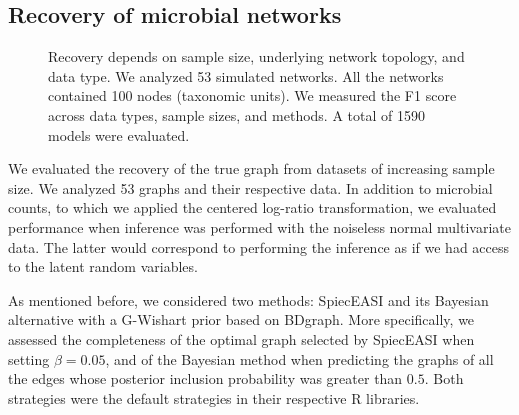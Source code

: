 \documentclass[
  a4paper,
]{article}
\begin{document}
\hypertarget{recovery-of-microbial-networks}{%
\subsection{Recovery of microbial
networks}\label{recovery-of-microbial-networks}}

\begin{figure}

\begin{minipage}[t]{\linewidth}

{\centering 


}

\end{minipage}%
\newline
\begin{minipage}[t]{\linewidth}

{\centering 


}

\end{minipage}%

\caption{\label{fig-prec_recall}Recovery depends on sample size,
underlying network topology, and data type. We analyzed 53 simulated
networks. All the networks contained 100 nodes (taxonomic units). We
measured the F1 score across data types, sample sizes, and methods. A
total of 1590 models were evaluated.}

\end{figure}

We evaluated the recovery of the true graph from datasets of increasing
sample size. We analyzed 53 graphs and their respective data. In
addition to microbial counts, to which we applied the centered log-ratio
transformation, we evaluated performance when inference was performed
with the noiseless normal multivariate data. The latter would correspond
to performing the inference as if we had access to the latent random
variables.

As mentioned before, we considered two methods: SpiecEASI and its
Bayesian alternative with a G-Wishart prior based on BDgraph. More
specifically, we assessed the completeness of the optimal graph selected
by SpiecEASI when setting \(\beta=0.05\), and of the Bayesian method
when predicting the graphs of all the edges whose posterior inclusion
probability was greater than \(0.5\). Both strategies were the default
strategies in their respective R libraries.
\end{document}
